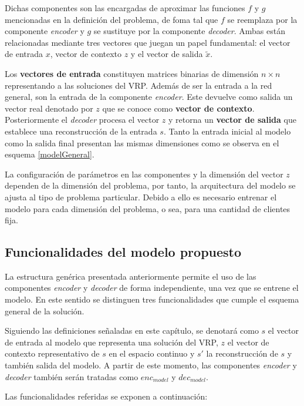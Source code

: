 Dichas componentes son las encargadas de aproximar las funciones $f$ y $g$ mencionadas en la definición del problema, de foma tal que $f$ se reemplaza por la componente \textit{encoder} y $g$ se sustituye por la componente \textit{decoder}. Ambas están relacionadas mediante tres vectores que juegan un papel fundamental: el vector de entrada $x$, vector de contexto $z$ y el vector de salida $\tilde{x}$.

Los \textbf{vectores de entrada} constituyen matrices binarias de dimensión $n \times n$ representando a las soluciones del VRP. Además de ser la entrada a la red general, son la entrada de la componente \textit{encoder}. Este devuelve como salida un vector real denotado por $z$ que se conoce como \textbf{vector de contexto}. Posteriormente el \textit{decoder} procesa el vector $z$ y retorna un \textbf{vector de salida} que establece una reconstrucción de la entrada $s$. Tanto la entrada inicial al modelo como la salida final presentan las mismas dimensiones como se observa en el esquema \ref{modelGeneral}.

La configuración de parámetros en las componentes y la dimensión del vector $z$ dependen de la dimensión del problema, por tanto, la arquitectura del modelo se ajusta al tipo de problema particular. Debido a ello es necesario entrenar el modelo para cada dimensión del problema, o sea, para una cantidad de clientes fija.


\subsection{Funcionalidades del modelo propuesto}

La estructura genérica presentada anteriormente permite el uso de las componentes \textit{encoder} y \textit{decoder} de forma independiente, una vez que se entrene el modelo. En este sentido se distinguen tres funcionalidades que cumple el esquema general de la solución.

Siguiendo las definiciones señaladas en este capítulo, se denotará como $s$ el vector de entrada al modelo que representa una solución del VRP, $z$ el vector de contexto representativo de $s$ en el espacio continuo y $s'$ la reconstrucción de $s$ y también salida del modelo. A partir de este momento, las componentes \textit{encoder} y \textit{decoder} también serán tratadas como $enc_{model}$ y $dec_{model}$. 

Las funcionalidades referidas se exponen a continuación:

